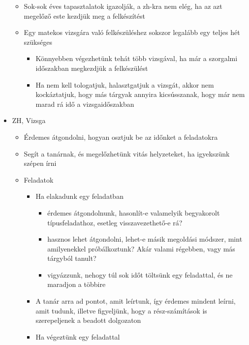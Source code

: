 \documentclass[../Main.tex]{subfiles}
\begin{document}
\begin{itemize}
\begin{itemize}
\begin{itemize}
        \end{itemize}
        \item Sok-sok éves tapasztalatok igazolják, a zh-kra nem elég, ha az azt megelőző
        este kezdjük meg a felkészítést
        \item Egy matekos vizsgára való felkészüléshez sokszor legalább egy teljes hét
        szükséges
        \begin{itemize}
            \item Könnyebben végezhetünk tehát több vizsgával, ha már a szorgalmi
            időszakban megkezdjük a felkészülést
            \item Ha nem kell tologatjuk, halasztgatjuk a vizsgát, akkor nem
            kockáztatjuk, hogy más tárgyak annyira kicsússzanak, hogy már nem
            marad rá idő a vizsgaidőszakban
        \end{itemize}
    \end{itemize}
    \item ZH, Vizsga
    \begin{itemize}
        \item Érdemes átgondolni, hogyan osztjuk be az időnket a feladatokra
        \item Segít a tanárnak, és megelőzhetünk vitás helyzeteket, ha igyekszünk szépen
        írni
        \item Feladatok
        \begin{itemize}
            \item Ha elakadunk egy feladatban
            \begin{itemize}
                \item érdemes átgondolnunk, hasonlít-e valamelyik begyakorolt
                típusfeladathoz, esetleg visszavezethető-e rá?
                \item hasznos lehet átgondolni, lehet-e másik megoldási módszer,
                mint amilyenekkel próbálkoztunk? Akár valami régebben, vagy
                más tárgyból tanult?
                \item vigyázzunk, nehogy túl sok időt töltsünk egy feladattal, és ne
                maradjon a többire
            \end{itemize}
            \item A tanár arra ad pontot, amit leírtunk, így érdemes mindent leírni, amit
            tudunk, illetve figyeljünk, hogy a rész-számítások is szerepeljenek a
            beadott dolgozaton
            \item Ha végeztünk egy feladattal

\end{itemize}
\end{itemize}
\end{itemize}
\end{document}
